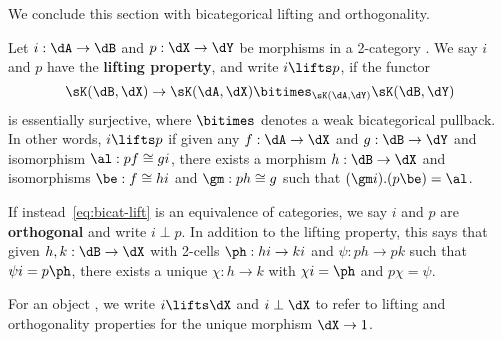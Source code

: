 We conclude this section with bicategorical lifting and orthogonality.

\begin{defn}\label{defn:2liftorth}
  Let $i:\dA\to\dB$ and $p:\dX\to\dY$ be morphisms in a 2-category \sK.
  We say $i$ and $p$ have the \textbf{lifting property}, and write $i \lifts p$, if the functor
  \begin{equation}
    \sK(\dB,\dX) \to \sK(\dA,\dX) \bitimes_{\sK(\dA,\dY)} \sK(\dB,\dY)\label{eq:bicat-lift}
  \end{equation}
  is essentially surjective, where $\bitimes$ denotes a weak bicategorical pullback.
  In other words, $i \lifts p$ if given any $f:\dA\to\dX$ and $g:\dB\to\dY$ and isomorphism $\al : p f \cong g i$, there exists a morphism $h:\dB\to \dX$ and isomorphisms $\be:f \cong h i$ and $\gm : p h \cong g$ such that $(\gm i).(p\be) = \al$.

  If instead~\eqref{eq:bicat-lift} is an equivalence of categories, we say $i$ and $p$ are \textbf{orthogonal} and write $i\perp p$.
  In addition to the lifting property, this says that given $h,k:\dB\to\dX$ with 2-cells $\ph:h i \to k i$ and $\psi : p h \to p k$ such that $\psi i = p \ph$, there exists a unique $\chi : h\to k$ with $\chi i = \ph$ and $p \chi = \psi$.

  For an object \dX, we write $i\lifts \dX$ and $i\perp \dX$ to refer to lifting and orthogonality properties for the unique morphism $\dX\to 1$.
\end{defn}

